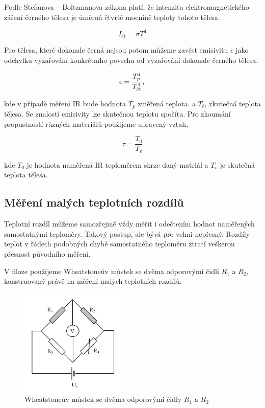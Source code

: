 \documentclass[a4paper,11pt]{article}
\begin{document}
Podle Stefanova – Boltzmanova zákona platí, že intenzita elektromagnetického záření černého tělesa je úměrná čtvrté mocnině teploty tohoto tělesa.

\begin{equation}
  I_{\text{čt}} = \sigma T^4 
\end{equation}

Pro tělesa, které dokonale černá nejsou potom můžeme zavést emisivitu $\epsilon$ jako
odchylku vyzařování konkrétního povrchu od vyzařování dokonale černého tělesa.

\begin{equation}
  \epsilon = \frac{T_p^4}{T_{\text{čt}}^4}, \\
\end{equation}

kde v případě měření IR bude hodnota $T_p$ změřená teplota. a $T_{\text{čt}}$ zkutečná teplota tělesa. 
Se znalostí emisivity lze skutečnou teplotu spočíta. 
Pro zkoumání propustností různých materiálů použijeme upravený vztah,

\begin{equation}
\tau = \frac{T_0}{T_v}
\end{equation}

kde $T_0$ je hodnota naměřená IR teploměrem skrze daný matriál a $T_v$ je skutečná teplota tělesa.

\newpage

\subsection{Měření malých teplotních rozdílů}

Teplotní rozdíl můžeme samozřejmě vždy měřit i odečtením hodnot naměřených samostatnými teploměry. 
Takový postup, ale bývá pro velmi nepřesný. 
Rozdíly teplot v řádech podobných chybě samostatného teploměru ztratí veškerou přesnost původního měření.

V úloze použijeme Wheatstoneův můstek se dvěma odporovými čidli $R_1$ a $R_2$, konstruovaný právě na měření malých teplotních rozdílů.

\begin{figure}[ht]
  \centering
  \includegraphics[width=0.45\textwidth]{mustek_diagram.png}
  \caption{Wheatstoneův můstek se dvěma odporovými čidly $R_1$ a $R_2$}
\end{figure}
\end{document}
